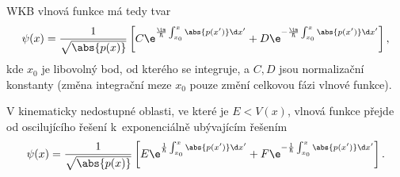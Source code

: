 WKB vlnová funkce má tedy tvar
\begin{equation}
    \psi(x)=\frac{1}{\sqrt{\abs{p(x)}}}\left[C\e^{\frac{\im}{\hbar}\int_{x_{0}}^{x}\abs{p(x')}\d x'}+D\e^{-\frac{\im}{\hbar}\int_{x_{0}}^{x}\abs{p(x')}\d x'}\right],
\end{equation}
kde $x_{0}$ je libovolný bod, od kterého se integruje, a $C,D$ jsou normalizační konstanty (změna integrační meze $x_0$ pouze změní celkovou fázi vlnové funkce).

V kinematicky nedostupné oblasti, ve které je $E<V(x)$, vlnová funkce přejde od oscilujícího řešení k~exponenciálně ubývajícím řešením
\begin{equation}
    \psi(x)=\frac{1}{\sqrt{\abs{p(x)}}}\left[E\e^{\frac{1}{\hbar}\int_{x_{0}}^{x}\abs{p(x')}\d x'}+F\e^{-\frac{1}{\hbar}\int_{x_{0}}^{x}\abs{p(x')}\d x'}\right].
\end{equation}